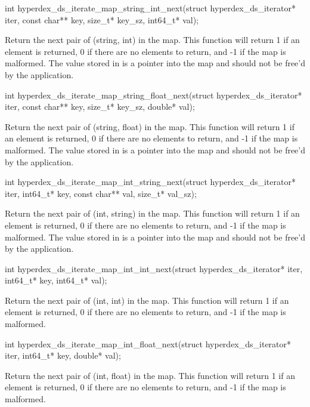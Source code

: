 \funcsep
\begin{ccode}
int hyperdex_ds_iterate_map_string_int_next(struct hyperdex_ds_iterator* iter,
                                            const char** key, size_t* key_sz,
                                            int64_t* val);
\end{ccode}
\funcdesc Return the next pair of (string, int) in the map.  This function will
return 1 if an element is returned, 0 if there are no elements to return, and -1
if the map is malformed.  The value stored in  is a pointer into the
map and should not be free'd by the application.

\funcsep
\begin{ccode}
int hyperdex_ds_iterate_map_string_float_next(struct hyperdex_ds_iterator* iter,
                                              const char** key, size_t* key_sz,
                                              double* val);
\end{ccode}
\funcdesc Return the next pair of (string, float) in the map.  This function
will return 1 if an element is returned, 0 if there are no elements to return,
and -1 if the map is malformed.  The value stored in  is a pointer
into the map and should not be free'd by the application.

\funcsep
\begin{ccode}
int hyperdex_ds_iterate_map_int_string_next(struct hyperdex_ds_iterator* iter,
                                            int64_t* key,
                                            const char** val, size_t* val_sz);
\end{ccode}
\funcdesc Return the next pair of (int, string) in the map.  This function will
return 1 if an element is returned, 0 if there are no elements to return, and -1
if the map is malformed.  The value stored in  is a pointer into the
map and should not be free'd by the application.

\funcsep
\begin{ccode}
int hyperdex_ds_iterate_map_int_int_next(struct hyperdex_ds_iterator* iter,
                                         int64_t* key, int64_t* val);
\end{ccode}
\funcdesc Return the next pair of (int, int) in the map.  This function will
return 1 if an element is returned, 0 if there are no elements to return, and -1
if the map is malformed.

\funcsep
\begin{ccode}
int hyperdex_ds_iterate_map_int_float_next(struct hyperdex_ds_iterator* iter,
                                           int64_t* key, double* val);
\end{ccode}
\funcdesc Return the next pair of (int, float) in the map.  This function will
return 1 if an element is returned, 0 if there are no elements to return, and -1
if the map is malformed.

